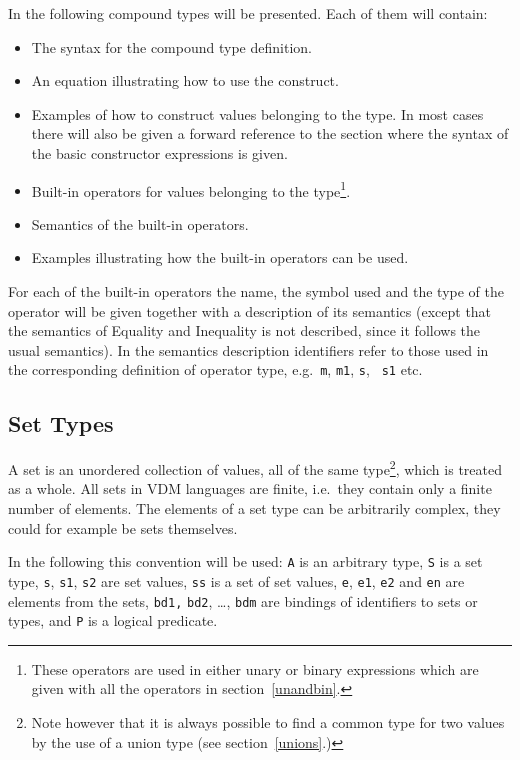 \documentclass{overturerepchap}
\begin{document}
In the following compound types will be presented. Each of
them will contain:
\begin{itemize}
\item The syntax for the compound type definition.
\item An equation illustrating how to use the construct.
\item Examples of how to construct values belonging to the type. In
  most cases there will also be given a forward reference to the
  section where the syntax of the basic constructor expressions is given.
\item Built-in operators for values belonging to the
  type\footnote{These operators are used in either unary or binary
    expressions which are given with all the operators in
    section~\ref{unandbin}.}.
\item Semantics of the built-in operators.
\item Examples illustrating how the built-in operators can be used.
\end{itemize}
For each of the built-in operators the name, the symbol used and the
type of the operator will be given together with a description of its
semantics (except that the semantics of Equality and Inequality is not
described, since it follows the usual semantics). In the semantics
description identifiers refer to those used in the corresponding
definition of operator type, e.g.\ {\tt m}, {\tt m1}, {\tt s}, {\tt
  s1} etc.

\subsection{Set Types}
\label{sets}

A set is an unordered collection of values, all of the same
type\footnote{Note however that it is always possible to find a common
  type for two values by the use of a union type (see
  section~\ref{unions}.)}, which is treated as a whole. All sets in 
VDM languages are finite, i.e.\ they contain only a finite
number of elements. The elements of a set type can be arbitrarily
complex, they could for example be sets themselves.

In the following this convention will be used: {\tt A} is an arbitrary
type, {\tt S} is a set type, {\tt s}, {\tt s1}, {\tt s2} are set
values, {\tt ss} is a set of set values, {\tt e}, {\tt e1}, {\tt e2}
and {\tt en} are elements from the sets, {\tt bd1,} {\tt bd2}, \ldots,
{\tt bdm} are bindings of identifiers to sets or types, and {\tt P} is
a logical predicate.
\end{document}
